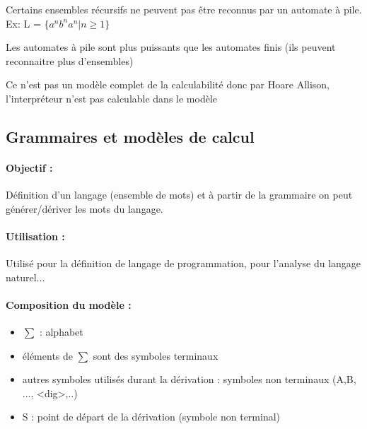 \begin{myprop}
	Certains ensembles récursifs ne peuvent pas être reconnus par un automate 
	à pile. Ex: L = $\{a^n b^n a^n | n\geq 1\}$
\end{myprop}

\begin{myprop}
	Les automates à pile sont plus puissants que les automates finis (ils 
	peuvent reconnaitre plus d'ensembles)
\end{myprop}

\begin{myprop}
	Ce n'est pas un modèle complet de la calculabilité donc par Hoare 
	Allison, l'interpréteur n'est pas calculable dans le modèle
\end{myprop}


\subsection{Grammaires et modèles de calcul}
\label{sub:grammaires_et_mod_les_de_calcul}

\paragraph{Objectif :}
Définition d'un langage (ensemble de mots) et à partir de la grammaire on peut 
générer/dériver les mots du langage.

\paragraph{Utilisation :} Utilisé pour la définition de langage de 
programmation, pour l'analyse du langage naturel...

\paragraph{Composition du modèle :}

\begin{itemize}
	\item $\sum$ : alphabet
	\item éléments de $\sum$ sont des symboles terminaux
	\item autres symboles utilisés durant la dérivation : symboles non 
		terminaux (A,B, ..., <dig>,..)
	\item S : point de départ de la dérivation (symbole non terminal)
\end{itemize}

